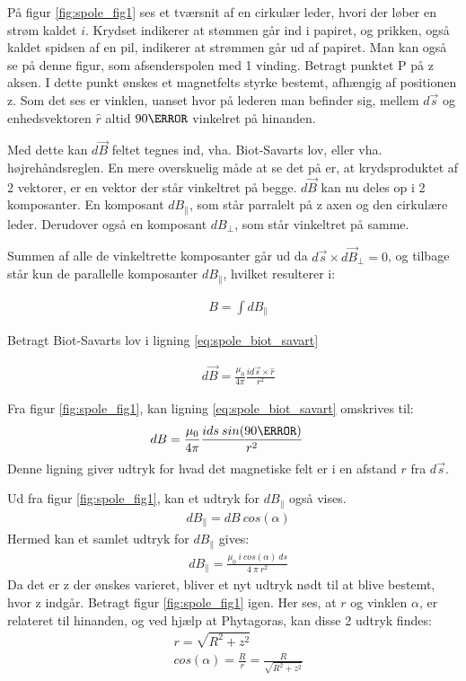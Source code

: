 På figur \ref{fig:spole_fig1} ses et tværsnit af en cirkulær leder, hvori der løber en strøm kaldet $i$. Krydset indikerer at stømmen går ind i papiret, og prikken, også kaldet spidsen af en pil, indikerer at strømmen går ud af papiret. Man kan også se på denne figur, som afsenderspolen med 1 vinding. Betragt punktet P på z aksen. I dette punkt ønskes et magnetfelts styrke bestemt, afhængig af positionen z. Som det ses er vinklen, uanset hvor på lederen man befinder sig, mellem $d\vec{s}$ og enhedsvektoren $\hat{r}$ altid $90\degree$ vinkelret på hinanden.

Med dette kan $d\vec{B}$ feltet tegnes ind, vha. Biot-Savarts lov, eller vha. højrehåndsreglen. En mere overskuelig måde at se det på er, at krydsproduktet af 2 vektorer, er en vektor der står vinkeltret på begge. 
$d\vec{B}$ kan nu deles op i 2 komposanter. En komposant $dB_\parallel$, som står parralelt på z axen og den cirkulære leder. Derudover også en komposant $dB_\perp$, som står vinkeltret på samme.

Summen af alle de vinkeltrette komposanter går ud da $d\vec{s}\times d\vec{B}_\perp=0$, og tilbage står kun de parallelle komposanter $dB_\parallel$, hvilket resulterer i:

 \begin{align}
 &B=\int dB_\parallel \label{eq:B_field}
 \end{align}

  
  
Betragt Biot-Savarts lov i ligning \ref{eq:spole_biot_savart}

\begin{align}
&d\vec{B}=\frac{\mu_0}{4\pi} \frac{i d\vec{s} \times \hat{r}}{r^2}\label{eq:spole_biot_savart}
\end{align}

Fra figur \ref{fig:spole_fig1}, kan ligning \ref{eq:spole_biot_savart} omskrives til:
\begin{align}
&dB=\frac{\mu_0}{4\pi} \frac{i ds\: sin(90\degree)}{r^2}\label{eq:spole_biot_savart2}
\end{align}
 Denne ligning giver udtryk for hvad det magnetiske felt er i en afstand $r$ fra $d\vec{s}$.
 
Ud fra figur \ref{fig:spole_fig1}, kan et udtryk for $dB_\parallel$ også vises.
 \begin{align}
 	&dB_\parallel=dB\: cos(\alpha)
 \end{align}
Hermed kan et samlet udtryk for $dB_\parallel$ gives: 
\begin{align}
&dB_\parallel=\frac{\mu_0 \:i\: cos(\alpha)\:ds}{4\:\pi\: r^2}
\end{align}
Da det er z der ønskes varieret, bliver et nyt udtryk nødt til at blive bestemt, hvor z indgår. Betragt figur \ref{fig:spole_fig1} igen. Her ses, at $r$ og vinklen $\alpha$, er relateret til hinanden, og ved hjælp at Phytagoras, kan disse 2 udtryk findes:
\begin{align}
&r=\sqrt{R^2+z^2} \\
&cos(\alpha)=\frac{R}{r}=\frac{R}{\sqrt{R^2+z^2}}
\end{align}

